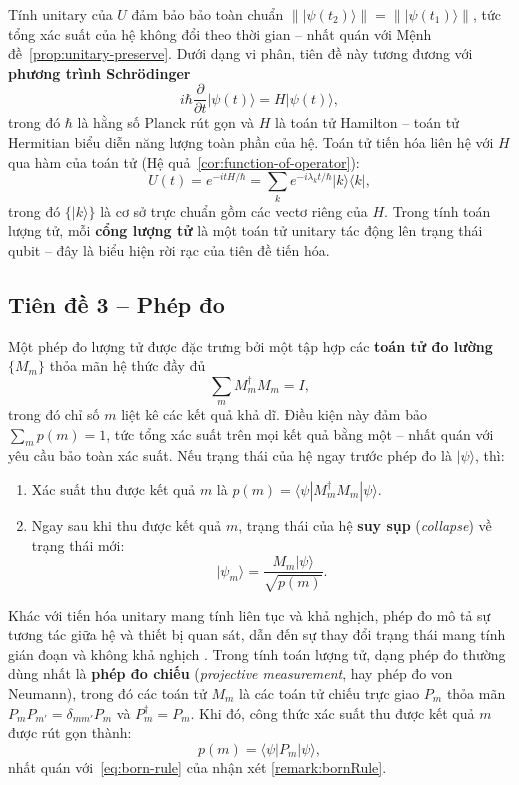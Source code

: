 \begin{remark}
Tính unitary của $U$ đảm bảo bảo toàn chuẩn
$\||\psi(t_2)\rangle\| = \||\psi(t_1)\rangle\|$, tức tổng xác suất của hệ không đổi
theo thời gian -- nhất quán với Mệnh đề~\ref{prop:unitary-preserve}. Dưới dạng vi
phân, tiên đề này tương đương với \textbf{phương trình Schrödinger}
$$i\hbar \frac{\partial}{\partial t}|\psi(t)\rangle = H|\psi(t)\rangle,$$
trong đó $\hbar$ là hằng số Planck rút gọn và $H$ là toán tử Hamilton -- toán tử
Hermitian biểu diễn năng lượng toàn phần của hệ. Toán tử tiến hóa liên hệ với $H$
qua hàm của toán tử (Hệ quả~\ref{cor:function-of-operator}):
$$U(t) = e^{-itH/\hbar} = \sum_k e^{-i\lambda_k t/\hbar}|k\rangle\langle k|,$$
trong đó $\{|k\rangle\}$ là cơ sở trực chuẩn gồm các vectơ riêng của $H$. Trong tính
toán lượng tử, mỗi \textbf{cổng lượng tử} là một toán tử unitary tác động lên trạng
thái qubit -- đây là biểu hiện rời rạc của tiên đề tiến hóa.
\end{remark}

\subsection*{Tiên đề 3 -- Phép đo}

\begin{postulate}[Phép đo]
Một phép đo lượng tử được đặc trưng bởi một tập hợp các \textbf{toán tử đo lường}
$\{M_m\}$ thỏa mãn hệ thức đầy đủ
$$\sum_m M_m^\dagger M_m = I,$$
trong đó chỉ số $m$ liệt kê các kết quả khả dĩ. Điều kiện này đảm bảo $\sum_m p(m) = 1$, tức tổng xác suất trên mọi kết quả bằng một -- nhất quán với yêu cầu bảo toàn xác suất. Nếu trạng thái của hệ ngay trước
phép đo là $|\psi\rangle$, thì:
\begin{enumerate}[label=(\roman*)]
    \item Xác suất thu được kết quả $m$ là
          $p(m) = \langle\psi|M_m^\dagger M_m|\psi\rangle.$
    \item Ngay sau khi thu được kết quả $m$, trạng thái của hệ \textbf{suy sụp}
          (\textit{collapse}) về trạng thái mới: 
          $$|\psi_m\rangle = \frac{M_m|\psi\rangle}{\sqrt{p(m)}}.$$
\end{enumerate}
\end{postulate}

Khác với tiến hóa unitary mang tính liên tục và khả nghịch, phép đo mô tả sự tương
tác giữa hệ và thiết bị quan sát, dẫn đến sự thay đổi trạng thái mang tính gián đoạn
và không khả nghịch \cite{ref5}. Trong tính toán lượng tử, dạng phép đo thường dùng nhất là
\textbf{phép đo chiếu} (\textit{projective measurement}, hay phép đo von Neumann),
trong đó các toán tử $M_m$ là các toán tử chiếu trực giao $P_m$ thỏa mãn
$P_m P_{m'} = \delta_{mm'} P_m$ và $P_m^\dagger = P_m$.  Khi đó, công thức xác suất thu được kết quả $m$ được rút gọn thành:
$$p(m) = \langle \psi | P_m | \psi \rangle,$$
nhất quán với~\eqref{eq:born-rule} của nhận xét \ref{remark:bornRule}.

